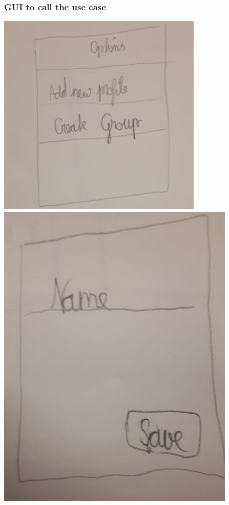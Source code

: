 \documentclass[12pt]{scrartcl}
\begin{document}
    \subsubsection{GUI to call the use case}
        \includegraphics[scale=.5]{Materials/Images/add_group1.png}
        \includegraphics[scale=.5]{Materials/Images/add_group2.png}
\end{document}
